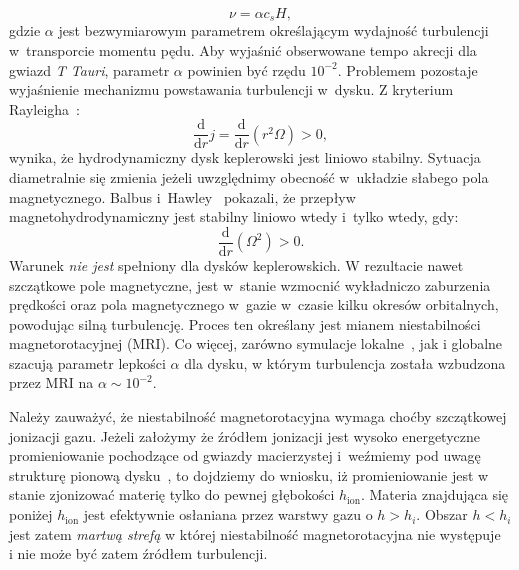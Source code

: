 \begin{equation}\label{eq:alpha}
\nu = \alpha c_s H,
\end{equation}
%
gdzie $\alpha$ jest bezwymiarowym parametrem określającym wydajność
turbulencji w~transporcie momentu pędu. Aby wyjaśnić obserwowane tempo akrecji
dla gwiazd \emph{T Tauri}, parametr $\alpha$ powinien być rzędu $10^{-2}$.
Problemem pozostaje wyjaśnienie mechanizmu powstawania turbulencji w~dysku. Z
kryterium Rayleigha~\cite{C61}:
%
\begin{equation}
   \frac{\mathrm{d}}{\mathrm{d}r} j =
   \frac{\mathrm{d}}{\mathrm{d}r}\left(r^2\Omega\right) > 0,
\end{equation}
%
wynika, że hydrodynamiczny dysk keplerowski jest liniowo stabilny. Sytuacja
diametralnie się zmienia jeżeli uwzględnimy obecność w~układzie 
słabego pola magnetycznego. Balbus i~Hawley~\citep{BH91} pokazali, że przepływ
magnetohydrodynamiczny jest stabilny liniowo wtedy i~tylko wtedy, gdy:
%
\begin{equation}\label{eq:mri}
   \frac{\mathrm{d}}{\mathrm{d}r}\left(\Omega^2\right) > 0.
\end{equation}
%
Warunek  \emph{nie jest} spełniony dla dysków keplerowskich. W
rezultacie nawet szczątkowe pole magnetyczne, jest w~stanie wzmocnić wykładniczo
zaburzenia prędkości oraz pola magnetycznego w~gazie w~czasie kilku okresów
orbitalnych, powodując silną turbulencję. Proces ten określany jest mianem
niestabilności magnetorotacyjnej (MRI). Co więcej, zarówno symulacje
lokalne~\cite{DSP10}, jak i globalne~\cite{FD11} szacują parametr lepkości
$\alpha$ dla dysku, w którym turbulencja została wzbudzona przez MRI na
$\alpha\sim 10^{-2}$.

\par Należy zauważyć, że niestabilność magnetorotacyjna wymaga choćby
szczątkowej jonizacji gazu. Jeżeli założymy że źródłem jonizacji jest wysoko
energetyczne promieniowanie pochodzące od gwiazdy macierzystej i~weźmiemy pod
uwagę strukturę pionową dysku~, to dojdziemy do wniosku, iż
promieniowanie jest w stanie zjonizować materię tylko do pewnej głębokości
$h_{\textrm{ion}}$. Materia znajdująca się poniżej $h_{\textrm{ion}}$ jest
efektywnie osłaniana przez warstwy gazu o $h > h_i$.  Obszar $h < h_i$ jest
zatem \emph{martwą strefą} w której niestabilność magnetorotacyjna nie
występuje~\cite{DFT10} i nie może być zatem źródłem turbulencji. 

